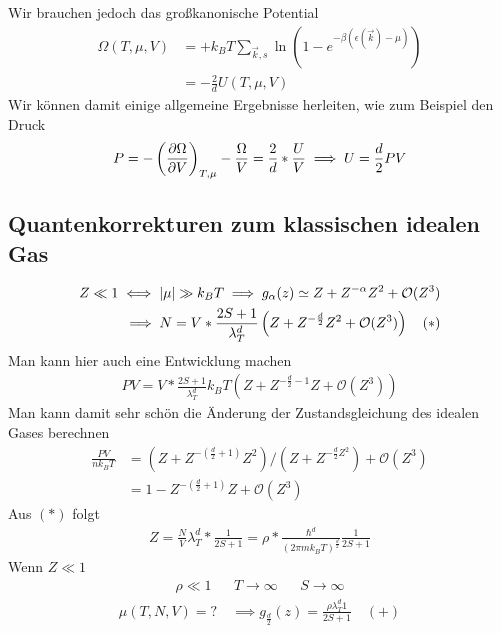 %
Wir brauchen jedoch das großkanonische Potential
%
\begin{align*}
  \Omega(T, \mu, V)  & = + k_B T \sum_{\vec{k},s}^{} \ln{(1-e^{-\beta(\epsilon(\vec{k}) - \mu)})}  \\
                     & = -\frac{2}{d} U(T, \mu, V)
\end{align*}
%
Wir können damit einige allgemeine Ergebnisse herleiten, wie zum Beispiel den Druck
%
\begin{align*}
  P = - \left( \frac{\partial \Omega }{\partial V} \right)_{T, \mu} - \frac{\Omega}{V} = 
  \frac{2}{d} * \frac{U}{V} \implies U = \frac{d}{2} PV
\end{align*}
%
\subsection*{Quantenkorrekturen zum klassischen idealen Gas}
%
\begin{align*}
  Z \ll 1 \iff \left| \mu \right| \gg k_B T \implies g_\alpha(z) \simeq Z + Z^{-\alpha} Z^2
  + \mathcal{O}(Z^3) \\
  \implies N = V * \frac{2S+1}{\lambda_T^d}\left(Z + Z^{-\frac{d}{2}} Z^2 + \mathcal{O}(Z^3)\right) \quad (*)
\end{align*}
%
Man kann hier auch eine Entwicklung machen
%
\begin{align*}
  P V = V * \frac{2S+1}{\lambda_T^d} k_B T \left( Z + Z^{-\frac{d}{2} - 1} Z + \mathcal{O}(Z^3) \right)
\end{align*}
%
Man kann damit sehr schön die Änderung der Zustandsgleichung des idealen Gases berechnen
%
\begin{align*}
  \frac{PV }{n k_B T} & = \left( Z + Z^{-\left( \frac{d}{2} + 1 \right)} Z^2 \right)/(Z+ Z^{-\frac{d}{2} Z^2}) + \mathcal{O}(Z^3) \\
                      & = 1 - Z^{-\left( \frac{d}{2} + 1 \right)} Z + \mathcal{O}(Z^3)
\end{align*}
%
Aus $(*)$ folgt
%
\begin{align*}
  Z = \frac{N}{V} \lambda_T^d * \frac{1}{2S +1} = \rho * \frac{\hbar^{d}}{(2 \pi m k_B T)^{\frac{d}{2}}} 
  \frac{1}{2 S + 1}
\end{align*}
%
Wenn $Z \ll 1$
%
\begin{align*}
  \rho \ll 1 && T\to\infty && S \to \infty
\end{align*}
%
%
\begin{align*}
  \mu(T, N, V) = ? \quad \implies g_{\frac{d}{2}}(z) = \frac{\rho \lambda_T^{d} 1}{2 S +1} \quad(+)
\end{align*}
